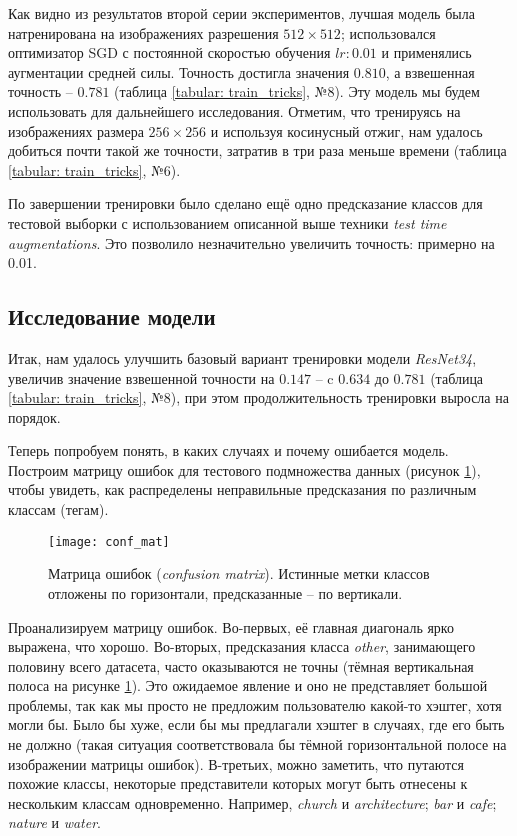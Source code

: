 \indent
\indent
Как видно из результатов второй серии экспериментов, лучшая модель
была натренирована на изображениях разрешения
$512 \times 512$; использовался
оптимизатор SGD с постоянной скоростью обучения $lr: 0.01$ и применялись
аугментации средней силы. Точность достигла значения $0.810$, а
взвешенная точность -- $0.781$ (таблица \ref{tabular: train_tricks}, №8).
Эту модель мы будем использовать для дальнейшего исследования.
Отметим, что тренируясь на изображениях размера $256 \times 256$ и 
используя косинусный отжиг, нам удалось добиться почти такой же точности,
затратив в три раза меньше времени (таблица \ref{tabular: train_tricks}, №6).


\indent
\indent
По завершении тренировки было сделано ещё одно предсказание классов
для тестовой выборки с использованием описанной выше техники
\textit{test time augmentations}. Это позволило незначительно увеличить
точность: примерно на 0.01.


\subsection{Исследование модели}


\indent
\indent
Итак, нам удалось улучшить базовый
вариант тренировки модели \textit{ResNet34},
увеличив значение взвешенной точности на $0.147$ -- 
 c $0.634$ до $0.781$ (таблица \ref{tabular: train_tricks}, №8), 
при этом продолжительность 
тренировки выросла на порядок.


\indent
\indent
Теперь попробуем понять, в каких случаях и почему
 ошибается модель. Построим матрицу ошибок
 для тестового подмножества данных
(рисунок \ref{tikzpicture: conf_mat}),
чтобы увидеть,  как распределены неправильные
предсказания по различным классам (тегам).


\begin{figure}[h!]
    \begin{center}
   	    \texttt{[image: conf\_mat]}
   	\end{center}
   	\caption{Матрица ошибок (\textit{confusion matrix}). Истинные метки 
   	               классов отложены по горизонтали, предсказанные -- по вертикали.}
   	\label{tikzpicture: conf_mat}
\end{figure}


\indent
\indent
Проанализируем матрицу ошибок.
Во-первых, её главная диагональ ярко выражена, что хорошо.
Во-вторых, предсказания класса \textit{other},
занимающего половину всего датасета, часто оказываются не 
точны (тёмная вертикальная полоса на рисунке \ref{tikzpicture: conf_mat}).
Это ожидаемое явление и оно не представляет большой проблемы, так как
мы просто не предложим пользователю какой-то хэштег, хотя могли бы.
Было бы хуже, если бы мы предлагали хэштег в случаях, где его 
быть не должно (такая ситуация соответствовала бы тёмной горизонтальной 
полосе на изображении матрицы ошибок).
В-третьих, можно заметить, что путаются похожие классы, 
некоторые представители
которых могут быть отнесены к нескольким классам одновременно.
Например, \textit{church} и \textit{architecture}; \textit{bar} и \textit{cafe};
\textit{nature} и \textit{water}.


